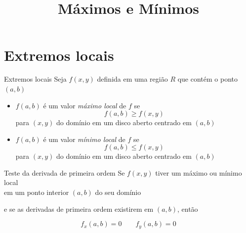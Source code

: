 
\usepackage{calculo_varias_variaveis-1}

\title{Máximos e Mínimos}



\addtitle

\section{Extremos locais}

\begin{frame}{Extremos locais}
  Seja $f(x, y)$ definida em uma região $R$ que contém o ponto $(a, b)$

  \pause
  \begin{itemize}[<+->]
    \item \(f(a, b)\) é um valor \emph{máximo local} de $f$ se
          \[
            f(a, b) \geq f(x, y)
          \]
          para \((x, y)\) do domínio em um disco aberto centrado em \((a, b)\)
          \\[5mm]
    \item \(f(a, b)\) é um valor \emph{mínimo local} de $f$ se
          \[
            f(a, b) \leq f(x, y)
          \]
          para \((x, y)\) do domínio em um disco aberto centrado em \((a, b)\)
  \end{itemize}
\end{frame}

\begin{frame}{Teste da derivada de primeira ordem}
  Se $f(x, y)$ tiver um máximo ou mínimo local\\
  em um ponto interior \((a, b)\) do seu domínio

  \pause
  \vspace{0.1\baselineskip}
  e se as derivadas de primeira ordem existirem em \((a, b)\), então

  \pause
  \vspace{0.1\baselineskip}
  \[
    f_x(a, b) = 0
    \qquad
    f_y(a, b) = 0
  \]
\end{frame}

